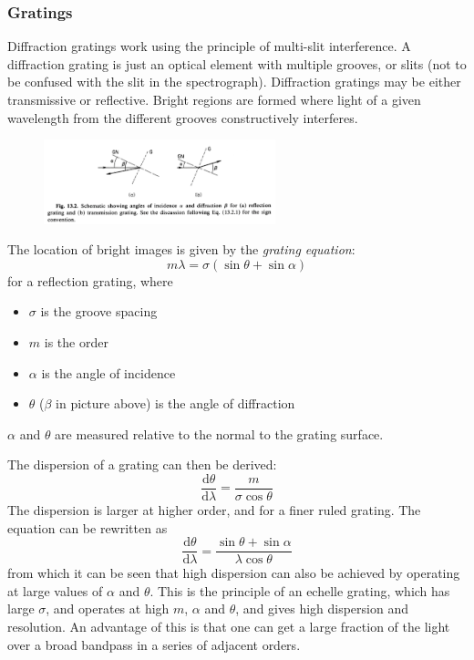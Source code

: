 \documentclass[12pt]{article}
\begin{document}
\subsubsection{Gratings}
Diffraction gratings work using the principle of multi-slit
interference. A diffraction grating is just an optical element with
multiple grooves, or slits (not to be confused with the slit in the
spectrograph). Diffraction gratings may be either transmissive or
reflective. Bright regions are formed where light of a given
wavelength from the different grooves constructively interferes.
\begin{figure}[ht]
    \centering
    \includegraphics[width=0.6\textwidth]{angle.png}
\end{figure}
The location of bright images is given by the
\emph{grating equation}:{$$
    m\lambda = \sigma\left(\sin\theta + \sin\alpha\right)
$$}for a reflection grating, where
\begin{itemize}
    \item $\sigma$ is the groove spacing
    \item $m$ is the order
    \item $\alpha$ is the angle of incidence
    \item $\theta$ ($\beta$ in picture above) is the angle of diffraction
\end{itemize}
$\alpha$ and $\theta$ are measured relative to the normal to the grating surface.

The dispersion of a grating can then be derived:{$$
    \frac{\textrm{d}\theta}{\textrm{d}\lambda} =
    \frac{m}{\sigma\cos\theta} $$
}The dispersion is larger at higher order, and for a
finer ruled grating. The equation can be rewritten as{$$
    \frac{\textrm{d}\theta}{\textrm{d}\lambda} =
    \frac{\sin\theta + \sin\alpha}{\lambda\cos\theta} $$
}from which it can be seen that high dispersion can also be achieved by
operating at large values of $\alpha$ and $\theta$. This is the
principle of an echelle grating, which has large $\sigma$, and
operates at high $m$, $\alpha$ and $\theta$, and gives high dispersion
and resolution. An advantage of this is that one can get a large
fraction of the light over a broad bandpass in a series of adjacent
orders.
\end{document}
